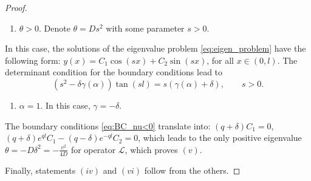 \documentclass{mpi2015-cscpreprint}
\newtheorem{lemma}[theorem]{Lemma}
\numberwithin{equation}{section}
\begin{document}
\begin{proof}
\begin{enumerate}
    \item[3)] $\theta>0$. Denote $\theta=Ds^2$ with some parameter $s>0$.
\end{enumerate}
 In this case, the solutions of the eigenvalue problem \eqref{eq:eigen_problem} have the following form:
$y(x)=C_1\cos(sx)+C_2\sin(sx)$,
for all $x \in (0,l)$. 
The determinant condition for the 
boundary conditions lead to 
\begin{equation}\label{eq:for_s}
(s^2-\delta\gamma(\alpha))\tan(sl)=s(\gamma(\alpha)+\delta),\qquad s>0.
\end{equation}

\begin{enumerate}
    \item[4)] $\alpha=1$. In this case, $\gamma=-\delta$.
\end{enumerate}
The boundary conditions \eqref{eq:BC_nu<0} translate into:
$
(q+\delta)C_1=0$, $(q+\delta)e^{ql}C_1-(q-\delta)e^{-ql}C_2=0$,
which leads to the only positive eigenvalue $\theta=-D\delta^2=-\frac{v^2}{4D}$ for operator $\mathcal{L}$, which proves $(v)$.

Finally, statements $(iv)$ and $(vi)$ follow from the others.
\end{proof}


\end{document}
